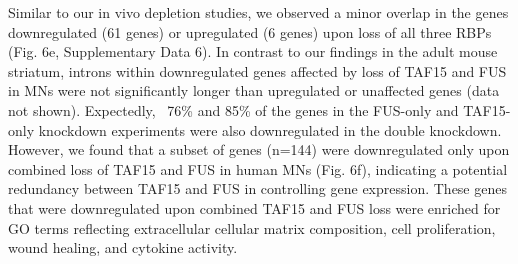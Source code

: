 Similar to our in vivo depletion studies, we observed a minor overlap in the genes downregulated (61 genes) or upregulated (6 genes) upon loss of all three RBPs (Fig. 6e, Supplementary Data 6). In contrast to our findings in the adult mouse striatum, introns within downregulated genes affected by loss of TAF15 and FUS in MNs were not significantly longer than upregulated or unaffected genes (data not shown). Expectedly, ~76\% and 85\% of the genes in the FUS-only and TAF15-only knockdown experiments were also downregulated in the double knockdown. However, we found that a subset of genes (n=144) were downregulated only upon combined loss of TAF15 and FUS in human MNs (Fig. 6f), indicating a potential redundancy between TAF15 and FUS in controlling gene expression. These genes that were downregulated upon combined TAF15 and FUS loss were enriched for GO terms reflecting extracellular cellular matrix composition, cell proliferation, wound healing, and cytokine activity.

